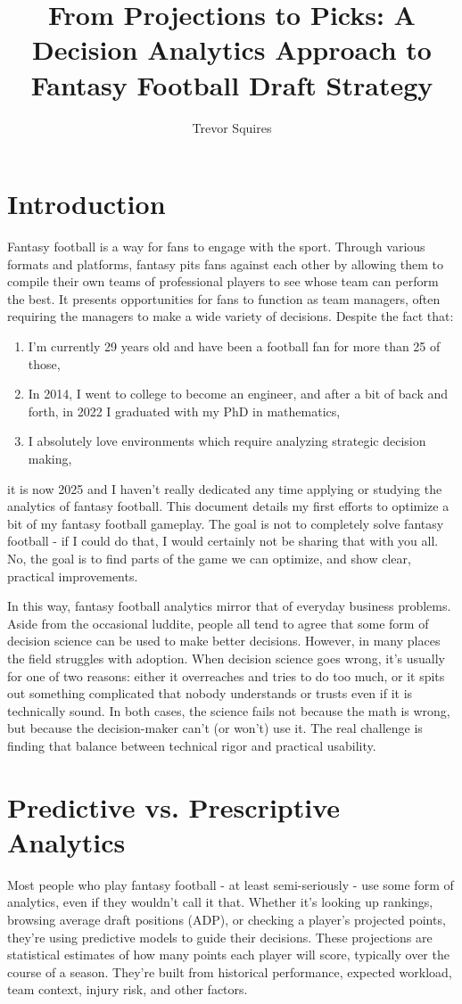 \documentclass{article}
\title{From Projections to Picks: A Decision Analytics Approach to Fantasy Football Draft Strategy}
\author{Trevor Squires}
\begin{document}
\maketitle

\section{Introduction}
Fantasy football is a way for fans to engage with the sport.
Through various formats and platforms, fantasy pits fans against each other by allowing them to compile their own teams of professional players to see whose team can perform the best.
It presents opportunities for fans to function as team managers, often requiring the managers to make a wide variety of decisions.
Despite the fact that:
\begin{enumerate}
  \item I'm currently 29 years old and have been a football fan for more than 25 of those,
  \item In 2014, I went to college to become an engineer, and after a bit of back and forth, in 2022 I graduated with my PhD in mathematics,
  \item I absolutely love environments which require analyzing strategic decision making,
\end{enumerate}
it is now 2025 and I haven't really dedicated any time applying or studying the analytics of fantasy football.
This document details my first efforts to optimize a bit of my fantasy football gameplay.
The goal is not to completely solve fantasy football - if I could do that, I would certainly not be sharing that with you all.
No, the goal is to find parts of the game we can optimize, and show clear, practical improvements.

In this way, fantasy football analytics mirror that of everyday business problems.
Aside from the occasional luddite, people all tend to agree that some form of decision science can be used to make better decisions.
However, in many places the field struggles with adoption.
When decision science goes wrong, it's usually for one of two reasons: either it overreaches and tries to do too much, or it spits out something complicated that nobody understands or trusts even if it is technically sound.
In both cases, the science fails not because the math is wrong, but because the decision-maker can't (or won't) use it.
The real challenge is finding that balance between technical rigor and practical usability.


\section{Predictive vs. Prescriptive Analytics}
Most people who play fantasy football - at least semi-seriously - use some form of analytics, even if they wouldn't call it that.
Whether it's looking up rankings, browsing average draft positions (ADP), or checking a player's projected points, they're using predictive models to guide their decisions.
These projections are statistical estimates of how many points each player will score, typically over the course of a season.
They're built from historical performance, expected workload, team context, injury risk, and other factors.
\end{document}
